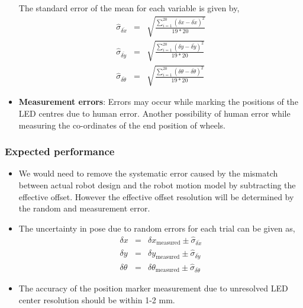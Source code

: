 \begin{itemize}
The standard error of the mean for each variable is given by,
\begin{equation}
\begin{array}{rcl}
\hat{\sigma}_{\overline{\delta x}} &=& \sqrt{\frac{\sum_{i=1}^{20} (\delta x - \overline{\delta x})^2}{19 * 20}} \\
\hat{\sigma}_{\overline{\delta y}} &=& \sqrt{\frac{\sum_{i=1}^{20} (\delta y - \overline{\delta y})^2}{19 * 20}} \\
\hat{\sigma}_{\overline{\delta \theta}} &=& \sqrt{\frac{\sum_{i=1}^{20} (\delta \theta - \overline{\delta \theta})^2}{19 * 20}}
\end{array}
\label{standard-deviation}
\end{equation}

\item \textbf{Measurement errors}: Errors may occur while marking the positions of the LED centres due to human error. Another possibility of human error while measuring the co-ordinates of the end position of wheels.   

\end{itemize}


\subsubsection*{Expected performance}
\begin{itemize}
\item We would need to remove the systematic error caused by the mismatch between actual robot design and the robot motion model by subtracting the effective offset. However the effective offset resolution will be determined by the random and measurement error.
\item The uncertainty in pose due to random errors for each trial can be given as,
\begin{equation}
\begin{array}{rcl}
\delta x &=& \delta x_{\text{measured}} \pm \hat{\sigma}_{\overline{\delta x}} \\
\delta y &=& \delta y_{\text{measured}} \pm \hat{\sigma}_{\overline{\delta y}} \\
\delta \theta &=& \delta \theta_{\text{measured}} \pm \hat{\sigma}_{\overline{\delta \theta}}
\end{array}
\label{mean-angular-deviation}
\end{equation}
\item The accuracy of the position marker measurement due to unresolved LED center resolution should be within 1-2 mm.
\end{itemize}

